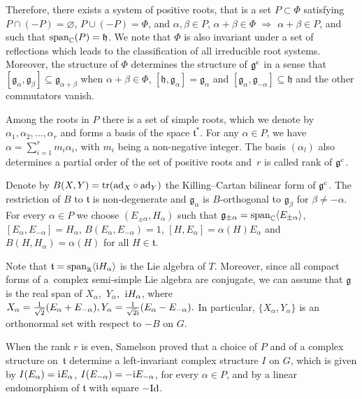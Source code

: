 \documentclass[10pt,a4paper]{amsart}
\numberwithin{equation}{section}
\begin{document}
Therefore, there exists a system of positive roots, that is a set $P \subset \Phi$ satisfying $P \cap (- P) = \varnothing$, $ P \cup (-P)=\Phi$, and $\alpha, \beta \in P$, $ \alpha + \beta \in \Phi$ $\Rightarrow$ $\alpha + \beta \in P$, and such that ${\rm {span}}_{\mathbb C}(P) = \mathfrak h$. We note that $\Phi$ is also invariant under a set of reflections which leads to the classification of all irreducible root systems. Moreover, the structure of $\Phi$ determines the structure of $\mathfrak g^{\rm c}$ in a sense that $[\mathfrak g_{\alpha}, \mathfrak g_{\beta}] \subseteq \mathfrak g_{\alpha +\beta}$ when $\alpha+\beta \in \Phi$, $[\mathfrak h,\mathfrak g_{\alpha}] = \mathfrak g_{\alpha}$ and $[\mathfrak g_{\alpha}, \mathfrak g_{-\alpha}] \subseteq \mathfrak h$ and the other commutators vanish.

Among the roots in $P$ there is a set of simple roots, which we denote by $\alpha_1, \alpha_2,\dots ,\alpha_r$ and forms a basis of the space $\mathfrak t^*$. For any $\alpha \in P$, we have $\alpha = \sum_{i =1}^r m_i\alpha_i$, with $m_i$ being a non-negative integer. The basis $(\alpha_l)$ also determines a partial order of the set of positive roots and~$r$ is called rank of $\mathfrak g^{\rm c}$.

Denote by $B(X,Y) = {\rm tr} ({\rm ad}_X \circ {\rm ad}_Y)$ the Killing--Cartan bilinear form of $\mathfrak g^{\rm c}$. The restriction of $B$ to $\mathfrak t$ is non-degenerate and $\mathfrak g_{\alpha}$ is $B$-orthogonal to $\mathfrak g_{\beta}$ for $\beta \neq - \alpha$.
 For every $\alpha \in P$ we choose $(E_{\pm \alpha}, H_{\alpha})$ such that $\mathfrak g_{\pm \alpha}= {\rm {span}}_{\mathbb C} \langle E_{\pm\alpha}\rangle$, $[E_{\alpha}, E_{-\alpha}]=H_{\alpha}$, $B(E_{\alpha}, E_{-\alpha}) = 1$, $[H, E_{\alpha}] = \alpha(H)E_{\alpha}$ and $B(H, H_{\alpha}) = \alpha(H)$ for all $H \in \mathfrak t$.

Note that $\mathfrak t = {\rm span}_{\mathbb R} \langle {\rm i} H_{\alpha}\rangle$ is the Lie algebra of $T$. Moreover, since all compact forms of a~complex semi-simple Lie algebra are conjugate, we can assume that $\mathfrak g$ is the real span of $X_{\alpha}$,~$Y_{\alpha}$,~${\rm i}H_{\alpha}$, where $X_{\alpha} = \frac{1}{\sqrt{2}}(E_{\alpha}+E_{-\alpha}), Y_{\alpha} = \frac{1}{\sqrt{2}{\rm i}}(E_{\alpha}-E_{-\alpha}).$
In particular, $\{ X_{\alpha}, Y_{\alpha} \} $ is an orthonormal set with respect to $- B$ on $G$.


When the rank $r$ is even, Samelson proved that a choice of $P$ and of a complex structure on~$\mathfrak t $ determine a left-invariant complex structure $I$ on $G$, which is given by $I(E_{\alpha})= {\rm i}E_{\alpha}$, $I(E_{-\alpha})=-{\rm i}E_{-\alpha}$, for every $\alpha \in P$, and by a linear endomorphism of $\mathfrak{t}$ with square $-{{\rm Id}}$.
\end{document}
